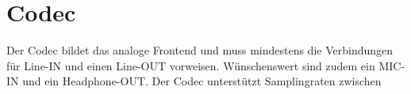 \section{Codec}
\label{sec:Konzept_Codec}

Der Codec bildet das analoge Frontend und muss mindestens die Verbindungen für Line-IN und einen Line-OUT vorweisen.
Wünschenswert sind zudem ein MIC-IN und ein Headphone-OUT.
Der Codec unterstützt Samplingraten zwischen 



